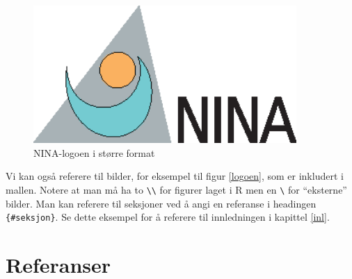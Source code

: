 \documentclass[11pt, a4paper]{article}
\begin{document}
\begin{figure}

\includegraphics[width=10cm,height=\textheight]{logo.eps} \hfill{}

\caption{NINA-logoen i større format \label{logo_stor}}

\end{figure}

Vi kan også referere til bilder, for eksempel til figur \ref{logoen},
som er inkludert i mallen. Notere at man må ha to
\texttt{\textbackslash{}\textbackslash{}} for figurer laget i R men en
\texttt{\textbackslash{}} for ``eksterne'' bilder. Man kan referere til
seksjoner ved å angi en referanse i headingen \texttt{\{\#seksjon\}}. Se
dette eksempel for å referere til innledningen i kapittel \ref{inl}.

\clearpage

\hypertarget{references}{%
\section{Referanser}\label{references}}

\setlength{\parindent}{-0.2in}
\setlength{\parskip}{8pt}

\noindent
\end{document}
